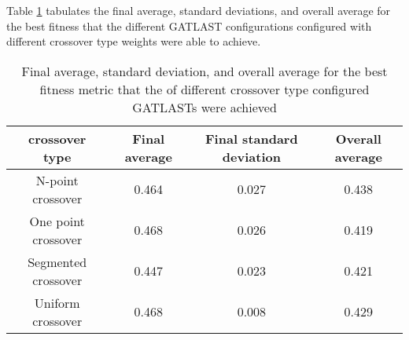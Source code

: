 Table \ref{tab:HP:GA:crossOverType:best fitness} tabulates the final average, standard deviations, and overall average for the best fitness that the different GATLAST configurations configured with different crossover type weights were able to achieve.
\begin{table}[tbh!]
\centering
\begin{adjustbox}{trim=0cm 0cm 0cm 0cm, clip=true}
\begin{tabular}{|c|c|c|c|}
\hline
crossover type & Final average & Final standard deviation & Overall average\\
\hline
N-point crossover & 0.464 & 0.027 & 0.438\\\hline
One point crossover & 0.468 & 0.026 & 0.419\\\hline
Segmented crossover & 0.447 & 0.023 & 0.421\\\hline
Uniform crossover & 0.468 & 0.008 & 0.429\\\hline
\end{tabular}
\end{adjustbox}
\caption{Final average, standard deviation, and overall average for the best fitness metric that the of different crossover type configured GATLASTs were achieved}
\label{tab:HP:GA:crossOverType:best fitness}
\end{table}